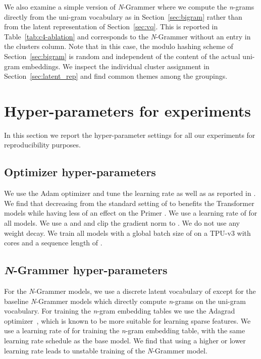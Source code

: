 \documentclass[11pt]{article}
\begin{document}
We also examine a simple version of \textit{N}-Grammer where we compute the \textit{n}-grams
directly from the uni-gram vocabulary as in Section~\ref{sec:bigram} rather than from the latent 
representation of Section~\ref{sec:vq}. This is reported in 
Table~\ref{tab:c4-ablation} and corresponds to the 
\textit{N}-Grammer without an entry
in the clusters column. Note that in this case, the modulo 
hashing scheme of 
Section~\ref{sec:bigram} is random and independent of the 
content of the actual uni-gram embeddings. We inspect the 
individual cluster assignment in Section~\ref{sec:latent_rep} 
and find common themes among the groupings.

\section{Hyper-parameters for experiments}\label{sec:hparams}
In this section we report the hyper-parameter settings for all our experiments for reproducibility purposes.

\subsection{Optimizer hyper-parameters}
We use the Adam optimizer
\citep{adam} and tune the learning rate as well as
 as reported in 
\citep{agarwal2020disentangling}. 
We find that decreasing  from the standard 
setting of  to 
 benefits the Transformer models while having less of an effect on the
Primer \citep{so2021primer}. We use a learning rate of 
 for all models.
We use a  and  and clip the gradient norm to .
We do not use any weight decay. We train all models with a global batch size of  on a TPU-v3 with 
cores and a sequence
length of .

\subsection{\textit{N}-Grammer hyper-parameters}
For the \textit{N}-Grammer models, we use a discrete latent vocabulary of 
except for the baseline \textit{N}-Grammer models which directly compute \textit{n}-grams
on the uni-gram vocabulary. For training the 
\textit{n}-gram embedding tables we use the Adagrad 
optimizer~\citep{duchi2011adaptive}, which is known to be
more suitable for learning sparse features. We use a learning 
rate of  for training the \textit{n}-gram embedding table,
with the same learning rate schedule as the base model. We find that
using a  higher or lower learning rate leads to unstable
training of the \textit{N}-Grammer model.
\end{document}
